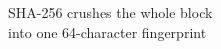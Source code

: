 \documentclass[preview]{standalone}
\begin{document}
\begin{center}
SHA-256 crushes the whole block\\into one 64-character fingerprint
\end{center}
\end{document}
